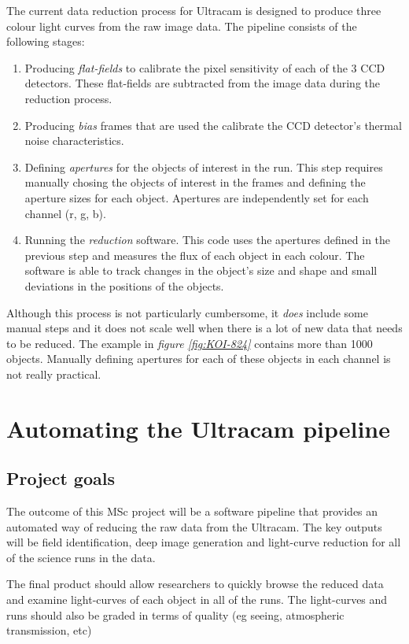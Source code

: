 \documentclass[a4paper,10pt]{article}
\begin{document}
The current data reduction process for Ultracam is designed to produce three colour light curves from the raw image data. The pipeline consists of the following stages:
\begin{enumerate}
	\item Producing \emph{flat-fields} to calibrate the pixel sensitivity of each of the 3 CCD detectors. These flat-fields are subtracted from the image data during the reduction process.
	\item Producing \emph{bias} frames that are used the calibrate the CCD detector's thermal noise characteristics. 
	\item Defining \emph{apertures} for the objects of interest in the run. This step requires manually chosing the objects of interest in the frames and defining the aperture sizes for each object. Apertures are independently set for each channel (r, g, b). 
	\item Running the \emph{reduction} software. This code uses the apertures defined in the previous step and measures the flux of each object in each colour. The software is able to track changes in the object's size and shape and small deviations in the positions of the objects. 
\end{enumerate} 
Although this process is not particularly cumbersome, it \emph{does} include some manual steps and it does not scale well when there is a lot of new data that needs to be reduced. The example in \emph{figure \ref{fig:KOI-824}} contains more than 1000 objects. Manually defining apertures for each of these objects in each channel is not really practical. 

\section{Automating the Ultracam pipeline}

\subsection{Project goals}
The outcome of this MSc project will be a software pipeline that provides an automated way of reducing the raw data from the Ultracam.  The key outputs will be field identification, deep image generation and light-curve reduction for all of the science runs in the data. 

The final product should allow researchers to quickly browse the reduced data and examine light-curves of each object in all of the 
runs. The light-curves and runs should also be graded in terms of quality (eg seeing, atmospheric transmission, etc) 
\end{document}
